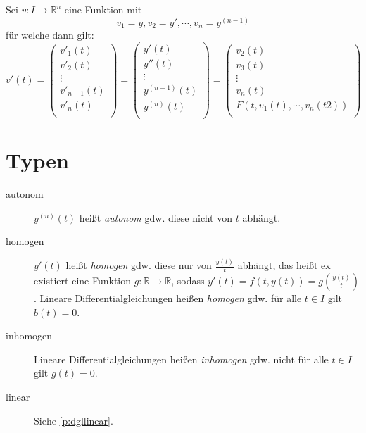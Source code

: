         Sei $ v : I \rightarrow \mathbb{R} ^ n $ eine Funktion mit \[ v _ 1 = y, v _ 2 = y', \cdots, v _ n = y ^ {( n - 1 )} \] für welche dann gilt:
        \begin{equation*}
            v'(t) =
            \begin{pmatrix}
                v' _ 1 (t) \\
                v' _ 2 (t) \\
                \vdots \\
                v' _ { n - 1 } (t) \\
                v' _ n (t) \\
            \end{pmatrix}
            =
            \begin{pmatrix}
                y'(t) \\
                y''(t) \\
                \vdots \\
                y ^ {(n - 1)} (t) \\
                y ^ {(n)} (t) \\
            \end{pmatrix}
            =
            \begin{pmatrix}
                v _ 2 (t) \\
                v _ 3 (t) \\
                \vdots \\
                v _ n (t) \\
                F(t, v _ 1 (t), \cdots, v _ n (t2)) \\
            \end{pmatrix}
        \end{equation*}


    \section{Typen}
        \begin{description}
            \item[autonom] $ y ^ {(n)} (t) $ heißt \textit{autonom} gdw. diese nicht von $ t $ abhängt.
            \item[homogen] $ y'(t) $ heißt \textit{homogen} gdw. diese nur von $ \frac{y(t)}{t} $ abhängt, das heißt ex existiert eine Funktion $ g : \mathbb{R} \rightarrow \mathbb{R} $, sodass $ y'(t) = f(t, y(t)) = g(\frac{y(t)}{t}) $. Lineare Differentialgleichungen heißen \textit{homogen} gdw. für alle $ t \in I $ gilt $ b(t) = 0 $.
            \item[inhomogen] Lineare Differentialgleichungen heißen \textit{inhomogen} gdw. nicht für alle $ t \in I $ gilt $ g(t) = 0 $.
            \item[linear] Siehe \ref{p:dgllinear}.
        \end{description}

